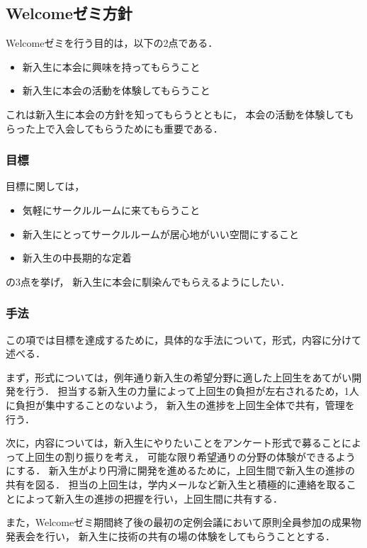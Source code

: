 \subsection*{Welcomeゼミ方針}


Welcomeゼミを行う目的は，以下の2点である．

\begin{itemize}
    \item 新入生に本会に興味を持ってもらうこと
    \item 新入生に本会の活動を体験してもらうこと
\end{itemize}
これは新入生に本会の方針を知ってもらうとともに，
本会の活動を体験してもらった上で入会してもらうためにも重要である．

\subsubsection*{目標}
目標に関しては，
\begin{itemize}
    \item 気軽にサークルルームに来てもらうこと
    \item 新入生にとってサークルルームが居心地がいい空間にすること
    \item 新入生の中長期的な定着
\end{itemize}
の3点を挙げ，
新入生に本会に馴染んでもらえるようにしたい．

\subsubsection*{手法}
この項では目標を達成するために，具体的な手法について，形式，内容に分けて述べる．

まず，形式については，例年通り新入生の希望分野に適した上回生をあてがい開発を行う．
担当する新入生の力量によって上回生の負担が左右されるため，1人に負担が集中することのないよう，
新入生の進捗を上回生全体で共有，管理を行う．

次に，内容については，新入生にやりたいことをアンケート形式で募ることによって上回生の割り振りを考え，
可能な限り希望通りの分野の体験ができるようにする．
新入生がより円滑に開発を進めるために，上回生間で新入生の進捗の共有を図る．
担当の上回生は，学内メールなど新入生と積極的に連絡を取ることによって新入生の進捗の把握を行い，上回生間に共有する．

また，Welcomeゼミ期間終了後の最初の定例会議において原則全員参加の成果物発表会を行い，
新入生に技術の共有の場の体験をしてもらうこととする．

